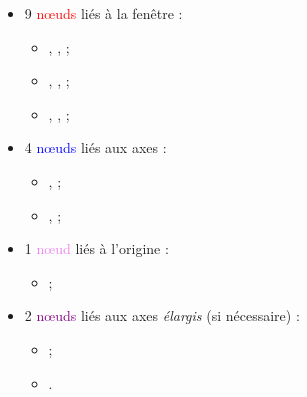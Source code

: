 \documentclass[11pt,a4paper]{ltxdoc}
\begin{document}
\begin{itemize}
  \item 9 \textcolor{red}{nœuds} liés à la fenêtre :
  \begin{itemize}
    \item {}, ,  ;
    \item {}, ,  ;
    \item {}, ,  ;
  \end{itemize}
  \item 4 \textcolor{blue}{nœuds} liés aux axes :
  \begin{itemize}
    \item {},  ;
    \item {},  ;
  \end{itemize}
  \item 1 \textcolor{violet}{nœud} liés à l'origine :
  \begin{itemize}
    \item {} ;
  \end{itemize}
  \item 2 \textcolor{purple}{nœuds} liés aux axes \textit{élargis} (si nécessaire) :
  \begin{itemize}
    \item {} ;
    \item {}.
  \end{itemize}
\end{itemize}
\end{document}
